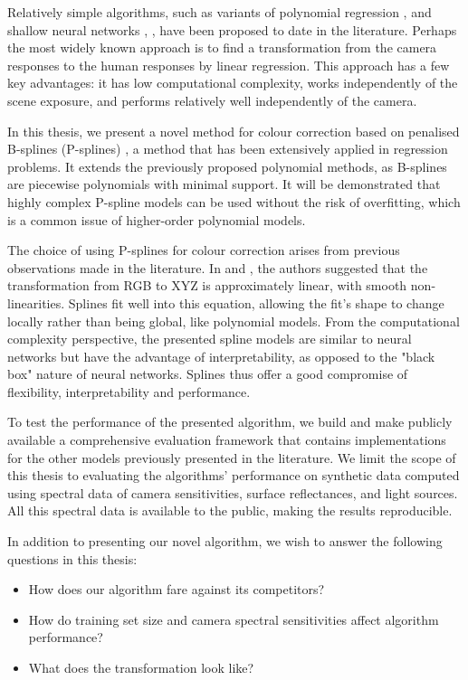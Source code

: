 Relatively simple algorithms, such as variants of polynomial regression \cite{CCvsPol}, \cite{finlayson2015color} and shallow neural networks \cite{macdonald2021camera}, \cite{kucuk2022exposure}, have been proposed to date in the literature. Perhaps the most widely known approach is to find a transformation from the camera responses to the human responses by linear regression. This approach has a few key advantages: it has low computational complexity, works independently of the scene exposure, and performs relatively well independently of the camera.


In this thesis, we present a novel method for colour correction based on penalised B-splines (P-splines) 
\cite{eilers1996flexible}, a method that has been extensively applied in regression problems. It extends the previously proposed polynomial methods, as B-splines are piecewise polynomials with minimal support. It will be demonstrated that highly complex P-spline models can be used without the risk of overfitting, which is a common issue of higher-order polynomial models. 

The choice of using P-splines for colour correction arises from previous observations made in the literature. In \cite{finlayson2015color} and \cite{wandell1993water}, the authors suggested that the transformation from RGB to XYZ is approximately linear, with smooth non-linearities. Splines fit well into this equation, allowing the fit's shape to change locally rather than being global, like polynomial models. From the computational complexity perspective, the presented spline models are similar to neural networks but have the advantage of interpretability, as opposed to the "black box" nature of neural networks. Splines thus offer a good compromise of flexibility, interpretability and performance.

To test the performance of the presented algorithm, we build and make publicly available a comprehensive evaluation framework that contains implementations for the other models previously presented in the literature. We limit the scope of this thesis to evaluating the algorithms' performance on synthetic data computed using spectral data of camera sensitivities, surface reflectances, and light sources. All this spectral data is available to the public, making the results reproducible.

In addition to presenting our novel algorithm, we wish to answer the following questions in this thesis: 

\begin{itemize}
    \item How does our algorithm fare against its competitors?
    \item How do training set size and camera spectral sensitivities affect algorithm performance?
    \item What does the transformation look like? 
\end{itemize}

